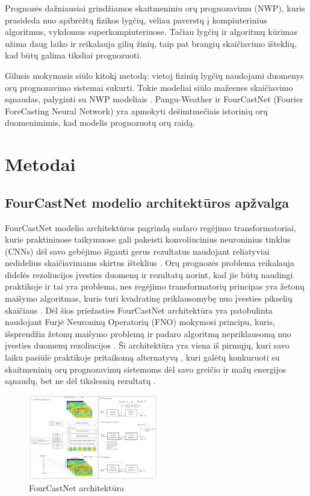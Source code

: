 \documentclass[conference]{IEEEtran}
\begin{document}
Prognozės dažniausiai grindžiamos skaitmeniniu orų prognozavimu (NWP), kuris prasideda nuo apibrėžtų fizikos lygčių, vėliau paverstų į kompiuterinius algoritmus, vykdomus superkompiuteriuose. Tačiau lygčių ir algoritmų kūrimas užima daug laiko ir reikalauja gilių žinių, taip pat brangių skaičiavimo išteklių, kad būtų galima tiksliai prognozuoti.

Gilusis mokymasis siūlo kitokį metodą: vietoj fizinių lygčių naudojami duomenys orų prognozavimo sistemai sukurti. Tokie modeliai siūlo mažesnes skaičiavimo sąnaudas, palyginti su NWP modeliais \cite{schultz2021}. Pangu-Weather \cite{bi2023accurate} ir FourCastNet  (Fourier ForeCasting Neural Network) \cite{pathak2022fourcastnet} yra apmokyti dešimtmečiais istorinių orų duomenimimis, kad modelis prognozuotų orų raidą. 

\section{Metodai}


\subsection{FourCastNet modelio architektūros apžvalga}

FourCastNet modelio architektūros pagrindą sudaro regėjimo transformatoriai, kurie praktiniuose taikymuose gali pakeisti konvoliucinius neuroninius tinklus (CNNs) dėl savo gebėjimo išgauti gerus rezultatus naudojant reliatyviai nedidelius skaičiavimams skirtus išteklius \cite{dosovitskiy2020image}. Orų prognozės problema reikalauja didelės rezoliucijos įvesties duomenų ir rezultatų norint, kad jie būtų naudingi praktikoje ir tai yra problema, nes regėjimo transformatorių principas yra žetonų maišymo algoritmas, kuris turi kvadratinę priklausomybę nuo įvesties pikselių skaičiaus \cite{guibas2021adaptive}. Dėl šios priežasties FourCastNet architektūra yra patobulinta naudojant Furjė Neuroninų Operatorių (FNO) mokymosi principu, kuris, išsprendžia žetonų maišymo problemą ir padaro algoritmą nepriklausomą nuo įvesties duomenų rezoliucijos \cite{guibas2021adaptive}. Ši architektūra yra viena iš pirmųjų, kuri savo laiku pasiūlė praktikoje pritaikomą alternatyvą , kuri galėtų konkuruoti su skaitmeninių orų prognozavimų sistemoms dėl savo greičio ir mažų energijos sąnaudų, bet ne dėl tikslesnių rezultatų  \cite{pathak2022fourcastnet}.

\begin{figure}[htb!] %
\centerline{\includegraphics[width=0.5\textwidth]{img/fourcastnet-architecture.png}}
\caption{FourCastNet architektūra}
\label{fig1}
\end{figure}
\end{document}
